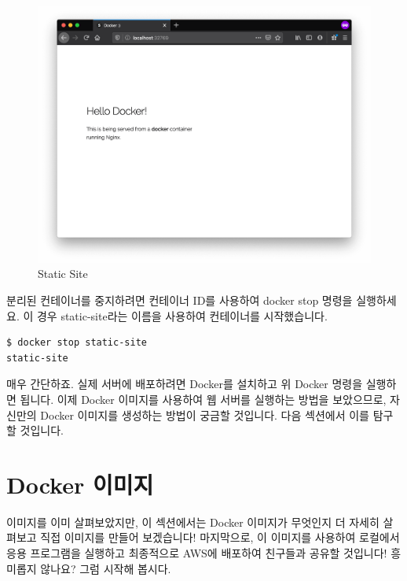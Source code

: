 \begin{figure}
\includegraphics[width=\textwidth]{images/static.png}
\caption{Static Site}
\label{fig:static}
\end{figure}


분리된 컨테이너를 중지하려면 컨테이너 ID를 사용하여 docker stop 명령을 실행하세요. 이 경우 static-site라는 이름을 사용하여 컨테이너를 시작했습니다.
\begin{lstlisting}[language=bash]
$ docker stop static-site
static-site
\end{lstlisting}

매우 간단하죠. 실제 서버에 배포하려면 Docker를 설치하고 위 Docker 명령을 실행하면 됩니다. 이제 Docker 이미지를 사용하여 웹 서버를 실행하는 방법을 보았으므로, 자신만의 Docker 이미지를 생성하는 방법이 궁금할 것입니다. 다음 섹션에서 이를 탐구할 것입니다.

\section{Docker 이미지}
이미지를 이미 살펴보았지만, 이 섹션에서는 Docker 이미지가 무엇인지 더 자세히 살펴보고 직접 이미지를 만들어 보겠습니다! 마지막으로, 이 이미지를 사용하여 로컬에서 응용 프로그램을 실행하고 최종적으로 AWS에 배포하여 친구들과 공유할 것입니다! 흥미롭지 않나요? 그럼 시작해 봅시다.

